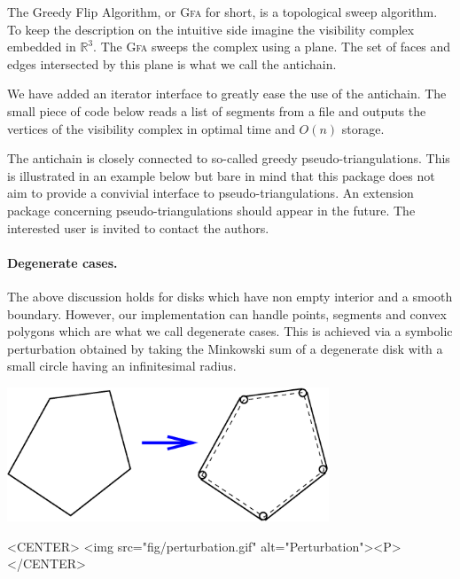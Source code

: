 The Greedy Flip Algorithm, or \textsc{Gfa} for short, is a topological sweep
algorithm.  To keep the description on the intuitive side imagine the visibility
complex embedded in $\mathbb{R}^3$. The \textsc{Gfa} sweeps the complex using a
plane.  The set of faces and edges intersected by this plane is what we call the
antichain.

We have added an iterator interface to greatly ease the use of the antichain.
The small piece of code below reads a list of segments from a file and outputs
the vertices of the visibility complex in optimal time and $O(n)$ storage.


The antichain is closely connected to so-called greedy pseudo-triangulations.
This is illustrated in an example below but bare in mind that this package does
not aim to provide a convivial interface to pseudo-triangulations. An extension
package concerning pseudo-triangulations should appear in the future. The
interested user is invited to contact the authors.

\paragraph{Degenerate cases.} The above discussion holds for disks which have
non empty interior and a smooth boundary. However, our implementation can handle
points, segments and convex polygons which are what we call degenerate cases. 
This is achieved via a symbolic perturbation obtained by taking the Minkowski sum 
of a degenerate disk with a small circle having an infinitesimal radius. 

\begin{ccTexOnly}
    \begin{center}
        \includegraphics[height=4cm]{fig/perturbation.eps}%
    \end{center}
\end{ccTexOnly}

\begin{ccHtmlOnly}
    <CENTER>
        <img src="fig/perturbation.gif" alt="Perturbation"><P>
    </CENTER>
\end{ccHtmlOnly}


